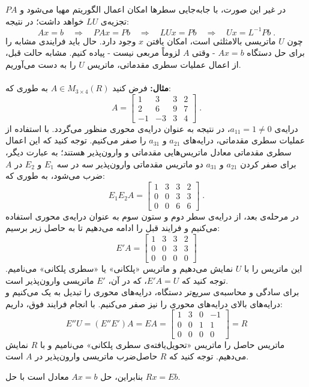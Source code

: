 در غیر این صورت، با جا‌به‌جایی سطر‌ها امکان اعمال الگوریتم مهیا می‌شود و $PA$ تجزیه‌ی $LU$ خواهد داشت؛ در نتیجه:
$$Ax=b\quad\Rightarrow\quad PAx=Pb\quad\Rightarrow\quad LUx=Pb\quad\Rightarrow\quad Ux=L^{-1}Pb \; .$$
چون $U$ ماتریسی بالا‌مثلثی است، امکان یافتن $x$ وجود دارد. حال باید فرایندی مشابه را برای حل دستگاه $Ax=b$ - وقتی $A$ لزوماً مربعی نیست - پیاده کنیم. مشابه حالت قبل، از اعمال عملیات سطری مقدماتی، ماتریس $U$ را به دست می‌آوریم.\\\\
\textbf{مثال:}
فرض کنید $A\in M_{3 \times 4}(R)$ به طوری که:
$$A = \begin{bmatrix}
1&3&3&2\\
2&6&9&7\\
-1&-3&3&4
\end{bmatrix} \; .$$
درایه‌ی $a_{11}=1\neq 0$، در نتیجه به عنوان درایه‌ی محوری منظور می‌گردد. با استفاده از عملیات سطری مقدماتی، درایه‌های $a_{21}$ و $a_{31}$ را صفر می‌کنیم. توجه کنید که این اعمال سطری مقدماتی معادل ماتریس‌هایی مقدماتی و وارون‌پذیر هستند؛ به عبارت دیگر، برای صفر کردن $a_{21}$ و $a_{31}$ دو ماتریس مقدماتی وارون‌پذیر سه در سه $E_{1}$ و $E_{2}$ در $A$ ضرب می‌شود، به طوری که:
$$E_{1}E_{2}A = \begin{bmatrix}
1&3&3&2\\
0&0&3&3\\
0&0&6&6
\end{bmatrix} \; .$$
در مرحله‌ی بعد، از درایه‌ی سطر دوم و ستون سوم به عنوان درایه‌ی محوری استفاده می‌کنیم و فرایند قبل را ادامه می‌دهیم تا به حاصل زیر برسیم:
$$E'A = \begin{bmatrix}
1&3&3&2\\
0&0&3&3\\
0&0&0&0
\end{bmatrix}$$
این ماتریس را با $U$ نمایش می‌دهیم و ماتریس «پلکانی» یا «سطری پلکانی» می‌نامیم. توجه کنید که $E'A=U$، که در آن،
$E'$
 ماتریسی وارون‌پذیر است.\\
برای سادگی و محاسبه‌ی سریع‌تر دستگاه، درایه‌های محوری را تبدیل به یک می‌کنیم و درایه‌های بالا‌ی درایه‌های محوری را نیز صفر می‌کنیم. با انجام فرایند فوق، داریم:
$$E'' U = (E'' E') A = EA = \begin{bmatrix}
1&3&0&-1\\
0&0&1&1\\
0&0&0&0
\end{bmatrix}=R$$
ماتریس حاصل را ماتریس «تحویل‌یافته‌ی سطری پلکانی» می‌نامیم و با $R$ نمایش می‌دهیم. توجه کنید که $R$ حاصل‌ضرب ماتریسی وارون‌پذیر در $A$ است.

بنابراین، حل $Ax=b$ معادل است با حل $Rx = E b$.


